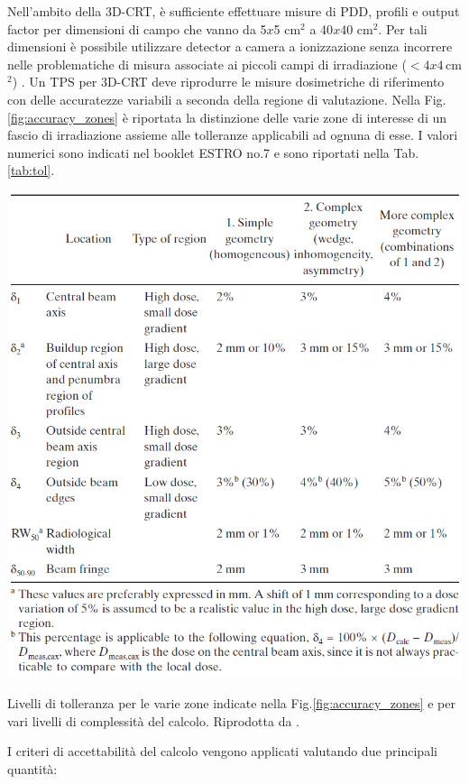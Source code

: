 Nell'ambito della 3D-CRT, è sufficiente effettuare misure di PDD, profili e output factor per dimensioni di campo che vanno da 5$x$5 cm$^2$ a 40$x$40 cm$^2$. Per tali dimensioni è possibile utilizzare detector a camera a ionizzazione senza incorrere nelle problematiche di misura associate ai piccoli campi di irradiazione ($< 4x4\,$cm$^2$) \cite{Das2008}. Un TPS per 3D-CRT deve riprodurre le misure dosimetriche di riferimento con delle accuratezze variabili a seconda della regione di valutazione. Nella Fig.\ref{fig:accuracy_zones} è riportata la distinzione  delle varie zone di interesse di un fascio di irradiazione assieme alle tolleranze applicabili ad ognuna di esse. I valori numerici sono indicati nel booklet ESTRO no.7 e sono riportati nella Tab.\ref{tab:tol}.

\begin{table}[!h]
\centering
\includegraphics[width=\textwidth]{./cap2/accuracy_tol.png}
\caption{Livelli di tolleranza per le varie zone indicate nella Fig.\ref{fig:accuracy_zones} e per vari livelli di complessità del calcolo. Riprodotta da \cite{Mijnheer2004}.}
\label{tab:tol}
\end{table}
I criteri di accettabilità del calcolo vengono applicati valutando due principali quantità:

